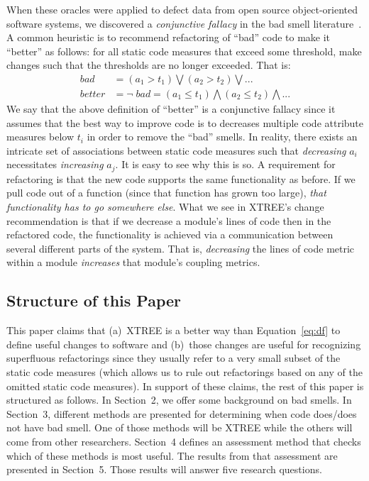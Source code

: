 \documentclass[twocolumn,5p]{elsarticle}
\newcommand{\eq}[1]{Equation~\ref{eq:#1}}
\theoremstyle{break}
\begin{document}
When these oracles were applied to defect data from
open source object-oriented software systems, we discovered a {\em conjunctive fallacy}
in the bad smell literature~\cite{erni96,bender99,Shatnawi10,Alves2010,hermans15}.
A common heuristic is to recommend refactoring of ``bad'' code
to make it ``better'' as follows: for all static code measures that exceed some threshold, make changes such that the thresholds are no longer exceeded. That is:
\begin{equation}\label{eq:df}
\scriptstyle
\begin{array}{rl}
\mathit{bad} & = \left(a_1 > t_1 \right) \bigvee \left(a_2 > t_2\right) \bigvee    ... \\
\mathit{better} & = \neg\;\mathit{bad} = \left(a_1 \le t_1 \right) \bigwedge \left(a_2 \le t_2\right)  \bigwedge  ...
\end{array}
\end{equation}
We say that the above definition of ``better'' is a conjunctive fallacy
since it assumes that the best way to improve code is to decreases multiple code attribute measures below $t_i$ in order
to remove the ``bad'' smells. In reality, there exists an intricate set of associations between static code measures
such that {\em decreasing}  $a_i$ necessitates {\em increasing} $a_j$.
It is easy to see why this is so.
A requirement for  refactoring is that the new code supports the same functionality
as before. If we pull code out of a function (since that function has grown too
large), {\em that functionality has to go somewhere else}. What we see in XTREE's change
recommendation is that if we decrease a module's lines of code  then in the refactored
code, the functionality is achieved via a communication between several different parts
of the system. That is, {\em decreasing} the lines of code metric within a module {\em increases}
that module's coupling metrics.

\subsection{Structure of this Paper}

This paper  claims that (a)~XTREE is a  better way than \eq{df}  to define useful changes to software and (b)~those changes are useful for recognizing   superfluous refactorings since they usually refer to a very 
small subset of the static code measures (which allows us to rule out refactorings based on any of the omitted
static code measures). 
In support of these claims, 
the rest of this paper is structured as follows. In Section~2, we offer some background on bad smells. In Section~3, 
  different methods are presented for determining when code does/does not have bad smell. One of those methods
  will be XTREE while the others will come from other researchers. Section~4
  defines an assessment method that checks which of these methods is most useful. The results from that assessment 
  are presented in Section~5. Those results will answer five research questions.
\end{document}
